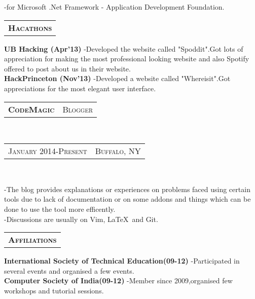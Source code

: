 \documentclass[10pt,a4paper,oneside]{article}
\begin{document}
\begin{minipage}[t]{0.33\textwidth}
\begin{adjustwidth}{7pt}{0pt}
{        -for Microsoft .Net Framework - Application Development Foundation.}
        \end{adjustwidth}
        \vspace{10pt}
        \begin{tabular}{c}
        \textbf{\normalsize H\textsc{acathons}}\\
        \end{tabular}
        \begin{adjustwidth}{7pt}{0pt}
            {\footnotesize \textbf{UB Hacking (Apr'13)} -Developed the website called "Spoddit".Got lots of appreciation for 
            making the most professional looking website and also Spotify offered to post
        about us in their website.}\\
            {\footnotesize \textbf{HackPrinceton (Nov'13)} -Developed a website called "Whereisit".Got appreciations for the
            most elegant user interface.}
            \vspace{0pt}\\
        \end{adjustwidth}
        \begin{tabular}{c|c}
            \textbf{\normalsize C\textsc{ode}M\textsc{agic}}
            &\textmd{\normalsize B\textsc{logger}}
        \end{tabular}\\
        \textcolor{light-gray}{
            \begin{tabular}{c|c}
                {\small J\textsc{anuary 2014}-P\textsc{resent}}
                &{\small B\textsc{uffalo}, NY}
            \end{tabular}
        }\\ 
        \vspace{-4mm}
        \begin{adjustwidth}{7pt}{0pt}
            {\footnotesize -The blog provides explanations or experiences on problems faced using certain tools due to lack
            of documentation or on some addons and things which can be done to use the tool more efficently.}\\
            {\footnotesize -Discussions are usually on Vim, \LaTeX \  and Git. }
        \end{adjustwidth}
        \vspace{10pt}
        \begin{tabular}{c}
        \textbf{\normalsize A\textsc{ffiliations}}\\
        \end{tabular}
        \begin{adjustwidth}{7pt}{0pt}
            {\footnotesize \textbf{International Society of Technical Education(09-12)} -Participated in several events and
            organised a few events.}\\
            {\footnotesize \textbf{Computer Society of India(09-12)} -Member since 2009,organised few workshops and
        tutorial sessions.}
            \vspace{0pt}\\
        \end{adjustwidth} 
    \end{minipage}
\end{document}
